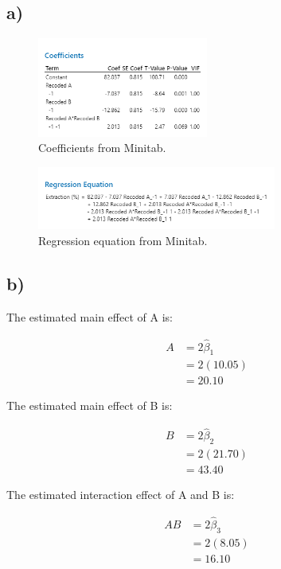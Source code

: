 \documentclass{article}
\begin{document}
\subsection*{a)}
\begin{figure}[h]
    \centering
    \includegraphics[width=0.5\textwidth]{./images/6_a_1.png}
    \caption{Coefficients from Minitab.}
    \label{fig:3_b_2}
\end{figure}

\begin{figure}[h]
    \centering
    \includegraphics[width=0.7\textwidth]{./images/6_a_2.png}
    \caption{Regression equation from Minitab.}
    \label{fig:3_b_2}
\end{figure}

\subsection*{b)}
\begin{flushleft}
The estimated main effect of A is:
\end{flushleft}
\begin{align*}
    A &= 2 \hat{\beta}_1\\
      &= 2(10.05)\\
      &= 20.10
\end{align*}
\begin{flushleft}
The estimated main effect of B is:
\end{flushleft}
\begin{align*}
    B &= 2 \hat{\beta}_2\\
      &= 2(21.70)\\
      &= 43.40
\end{align*}
\begin{flushleft}
The estimated interaction effect of A and B is:
\end{flushleft}
\begin{align*}
    AB &= 2 \hat{\beta}_3\\
       &= 2(8.05)\\
       &= 16.10
\end{align*}
\end{document}
